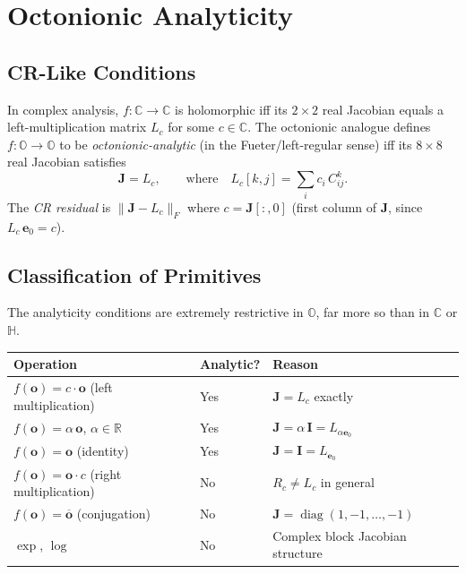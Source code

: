 \documentclass[11pt]{article}
\newcommand{\OO}{\mathbb{O}}
\newcommand{\HH}{\mathbb{H}}
\newcommand{\CC}{\mathbb{C}}
\newcommand{\RR}{\mathbb{R}}
\newcommand{\ee}[1]{\mathbf{e}_{#1}}
\newcommand{\conj}[1]{\overline{#1}}
\newcommand{\norm}[1]{\lVert #1 \rVert}
\newcommand{\Lmat}[1]{L_{#1}}
\newcommand{\Rmat}[1]{R_{#1}}
\begin{document}
\section{Octonionic Analyticity}

\subsection{CR-Like Conditions}

In complex analysis, $f:\CC\to\CC$ is holomorphic iff its $2\times 2$ real
Jacobian equals a left-multiplication matrix $\Lmat{c}$ for some
$c\in\CC$.  The octonionic analogue defines $f:\OO\to\OO$ to be
\emph{octonionic-analytic} (in the Fueter/left-regular sense) iff its
$8\times 8$ real Jacobian satisfies
\begin{equation}
  \mathbf{J} = \Lmat{c},
  \qquad\text{where}\quad
  \Lmat{c}[k,j] = \sum_i c_i\,C_{ij}^k.
\end{equation}
The \emph{CR residual} is $\norm{\mathbf{J} - \Lmat{c}}_F$ where
$c = \mathbf{J}[:,0]$ (first column of $\mathbf{J}$, since $\Lmat{c}\,\ee{0} = c$).

\subsection{Classification of Primitives}

The analyticity conditions are extremely restrictive in $\OO$, far more
so than in $\CC$ or $\HH$.

\begin{center}
\begin{tabular}{lll}
  \toprule
  Operation & Analytic? & Reason \\
  \midrule
  $f(\mathbf{o}) = c \cdot \mathbf{o}$ (left multiplication) & Yes & $\mathbf{J} = \Lmat{c}$ exactly \\
  $f(\mathbf{o}) = \alpha\,\mathbf{o}$, $\alpha\in\RR$ & Yes & $\mathbf{J} = \alpha\,\mathbf{I} = \Lmat{\alpha\ee{0}}$ \\
  $f(\mathbf{o}) = \mathbf{o}$ (identity) & Yes & $\mathbf{J} = \mathbf{I} = \Lmat{\ee{0}}$ \\
  $f(\mathbf{o}) = \mathbf{o} \cdot c$ (right multiplication) & No & $\Rmat{c} \neq \Lmat{c}$ in general \\
  $f(\mathbf{o}) = \conj{\mathbf{o}}$ (conjugation) & No & $\mathbf{J} = \operatorname{diag}(1,-1,\ldots,-1)$ \\
  $\exp$, $\log$ & No & Complex block Jacobian structure \\
  \bottomrule
\end{tabular}
\end{center}
\end{document}
